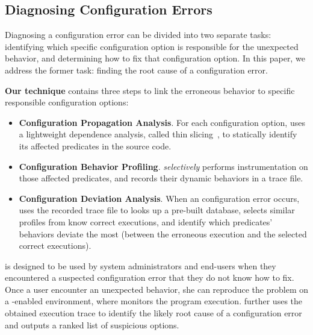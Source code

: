 
\subsection{Diagnosing Configuration Errors}

Diagnosing a configuration error can be divided into two
separate tasks: identifying which specific configuration option is
responsible for the unexpected behavior, and determining how to fix that
configuration option. In this paper, we address the former task: finding
the root cause of a configuration error.


\textbf{Our technique} contains three steps to 
link the erroneous behavior to specific responsible configuration options:

\begin{itemize}
\item \textbf{Configuration Propagation Analysis}. For
each configuration option, \ourtool
uses a lightweight dependence analysis, called thin slicing~\cite{Sridharan:2007},
to statically identify its affected predicates in the source code.

\item \textbf{Configuration Behavior Profiling}. \ourtool
\textit{selectively} performs instrumentation on those
affected predicates, and records their
dynamic behaviors in a trace file.

\item \textbf{Configuration Deviation Analysis}.
When an configuration error occurs, \ourtool uses
the recorded trace file to looks up a
pre-built database, selects similar profiles
from know correct executions, and identify which
predicates' behaviors deviate the most (between
the erroneous execution and the selected correct executions).

\end{itemize}

\ourtool is designed to be used by system administrators and end-users when they
encountered a suspected configuration error that they do not
know how to fix. Once a \ourtool user encounter an unexpected
behavior, she can reproduce the problem on a \ourtool-enabled environment,
where \ourtool monitors the program execution. \ourtool
further uses the obtained execution trace to
identify the likely root cause of a configuration error and
outputs a ranked list of suspicious options.

